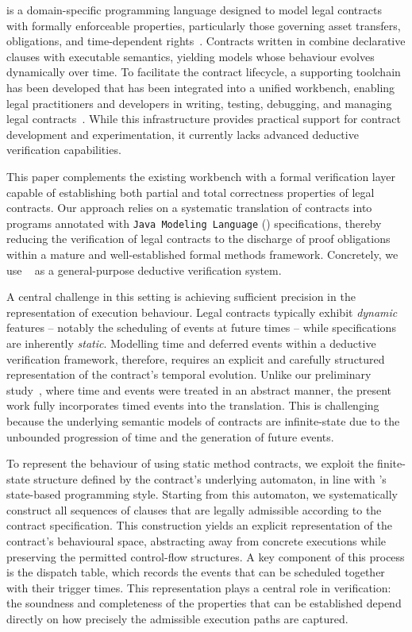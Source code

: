 
{\Stipula} is a domain-specific programming language designed to model
legal contracts with formally enforceable properties, particularly
those governing asset transfers, obligations, and time-dependent
rights~\cite{CrafaLSV23}.  Contracts written in {\Stipula} combine
declarative clauses with executable semantics, yielding models whose
behaviour evolves dynamically over time. To facilitate the contract
lifecycle, a supporting toolchain has been developed that has been
integrated into a unified workbench, enabling legal practitioners and
developers in writing, testing, debugging, and managing legal
contracts~\cite{Laneve2026,stipulaprototype}.  While this
infrastructure provides practical support for contract development and
experimentation, it currently lacks advanced deductive verification
capabilities.

This paper complements the existing {\Stipula} workbench with a formal
verification layer capable of establishing both partial and total
correctness properties of legal contracts.  Our approach relies on a
systematic translation of {\Stipula} contracts into {\Java} programs
annotated with {\tt Java Modeling Language} ({\JML}) specifications,
thereby reducing the verification of legal contracts to the discharge
of proof obligations within a mature and well-established formal
methods framework.  Concretely, we use {\KeY}~\cite{KeYTutorial24} as
a general-purpose deductive verification system.

A central challenge in this setting is achieving sufficient precision
in the representation of execution behaviour. Legal contracts
typically exhibit \emph{dynamic} features -- notably the scheduling of
events at future times -- while {\JML} specifications are inherently
\emph{static}.  Modelling time and deferred events within a deductive
verification framework, therefore, requires an explicit and carefully
structured representation of the contract's temporal evolution. Unlike
our preliminary study~\cite{iFM25}, where time and events were treated
in an abstract manner, the present work fully incorporates timed
events into the translation. This is challenging because the
underlying semantic models of {\Stipula} contracts are infinite-state
due to the unbounded progression of time and the generation of future
events.

To represent the behaviour of {\Stipula} using static method contracts, we exploit the 
finite-state structure defined by the contract's underlying automaton, in line 
with {\Stipula}'s state-based programming style. Starting from this automaton, 
we systematically construct all sequences of clauses that are legally admissible 
according to the contract specification. This construction yields an explicit 
representation of the contract's behavioural space, abstracting away from concrete 
executions while preserving the permitted control-flow structures. A key component 
of this process is the dispatch table, which records the events that can be scheduled 
together with their trigger times. This representation plays a central role in 
verification: the soundness and completeness of the properties that can be established depend 
directly on how precisely the admissible execution paths are captured.

